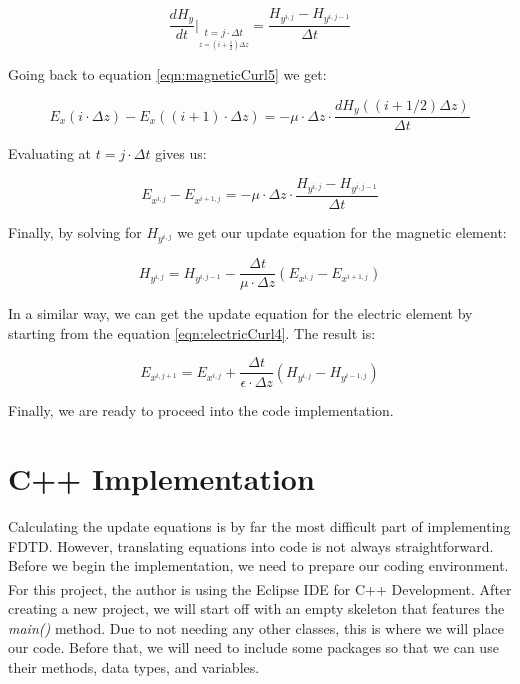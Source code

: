 \begin{equation}
	\label{eqn:timeDerivativeH}
	\frac{d H_y}{dt} \bigg\rvert_{\underset{z = (i + \frac{1}{2}) \Delta z}{t=j \cdot \Delta t}} = \frac{H_{y^{i,j}} - H_{y^{i,j-1}}}{\Delta t}
\end{equation}

Going back to equation \ref{eqn:magneticCurl5} we get:

\begin{equation}
	\label{eqn:timeDerivativeE2}
	E_x(i \cdot \Delta z) - E_x((i+1) \cdot \Delta z) = -\mu \cdot \Delta z \cdot \frac{d H_y((i+1/2)\Delta z) }{\Delta t}
\end{equation}

Evaluating at $t = j \cdot \Delta t$ gives us:

\begin{equation}
	\label{eqn:timeDerivativeE3}
	E_{x^{i,j}} - E_{x^{i+1,j}} = -\mu \cdot \Delta z \cdot \frac{H_{y^{i,j}} - H_{y^{i,j-1}}}{\Delta t}
\end{equation}

Finally, by solving for ${H_{y^{i,j}}}$ we get our update equation for the magnetic element:
	
\begin{equation}
	\label{eqn:magneticUpdate}
	H_{y^{i,j}} = H_{y^{i,j-1}} - \frac{\Delta t}{\mu \cdot \Delta z}(E_{x^{i,j}} - E_{x^{i+1,j}})
\end{equation}

In a similar way, we can get the update equation for the electric element by starting from the equation \ref{eqn:electricCurl4}. The result is:

\begin{equation}
	\label{eqn:electricUpdate}
	E_{x^{i,j+1}} = E_{x^{i,j}} + \frac{\Delta t}{\epsilon \cdot \Delta z}(H_{y^{i,j}} -  H_{y^{i-1,j}})
\end{equation}

Finally, we are ready to proceed into the code implementation.


\section{C++ Implementation}

Calculating the update equations is by far the most difficult part of implementing FDTD. However, translating equations into code is not always straightforward. Before we begin the implementation, we need to prepare our coding environment. For this project, the author is using the Eclipse IDE for C++ Development\textsuperscript{\cite{eclipse}}. After creating a new project, we will start off with an empty skeleton that features the \textit{main()} method. Due to not needing any other classes, this is where we will place our code. Before that, we will need to include some packages so that we can use their methods, data types, and variables.

